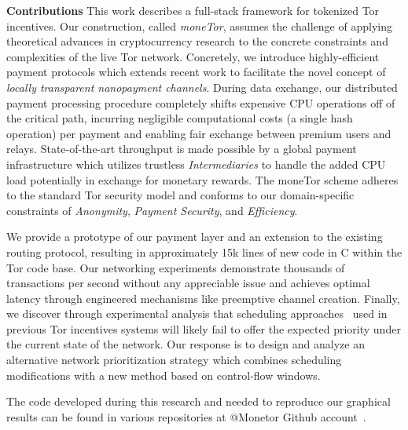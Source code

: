 \label{sec:Contributions}
\textbf{Contributions} This work describes a full-stack framework for tokenized
Tor incentives. Our construction, called \emph{moneTor}, assumes the challenge
of applying theoretical advances in cryptocurrency research to the concrete
constraints and complexities of the live Tor network. Concretely, we introduce
highly-efficient payment protocols which extends recent work to facilitate the
novel concept of \emph{locally transparent nanopayment channels}. During data
exchange, our distributed payment processing procedure completely shifts
expensive CPU operations off of the critical path, incurring negligible
computational costs (a single hash operation) per payment and enabling fair
exchange between premium users and relays. State-of-the-art throughput is made
possible by a global payment infrastructure which utilizes trustless
\emph{Intermediaries} to handle the added CPU load potentially in exchange for
monetary rewards. The moneTor scheme adheres to the standard Tor security model
and conforms to our domain-specific constraints of \emph{Anonymity},
\emph{Payment Security}, and \emph{Efficiency}.

We provide a prototype of our payment layer and an extension to the existing
routing protocol, resulting in approximately 15k lines of new code in C within
the Tor code base. Our networking experiments demonstrate thousands of
transactions per second without any appreciable issue and achieves optimal
latency through engineered mechanisms like preemptive channel creation. Finally,
we discover through experimental analysis that scheduling
approaches~\cite{dovrolis1999case, tang2010improved} used in previous Tor
incentives systems will likely fail to offer the expected priority under the
current state of the network. Our response is to design and analyze an
alternative network prioritization strategy which combines scheduling
modifications with a new method based on control-flow windows.

The code developed during this research and needed to reproduce our
graphical results can be found in various repositories at @Monetor
Github account~\cite{monetor-github}.


